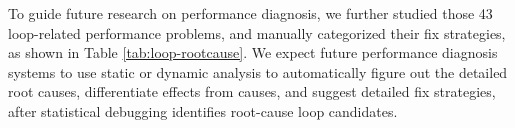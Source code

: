 To guide future research on performance diagnosis, we further
studied those 43 loop-related performance problems, and manually categorized 
their fix strategies, as shown in
Table \ref{tab:loop-rootcause}.
We expect future performance diagnosis systems to use static or
dynamic analysis to automatically figure out the detailed 
root causes, differentiate effects from causes, and suggest
detailed fix strategies, after statistical debugging identifies
root-cause loop candidates.


